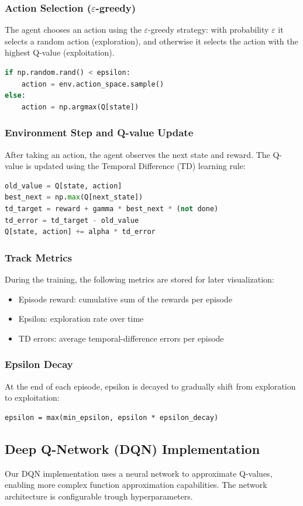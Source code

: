 \documentclass[a4paper,12pt]{article}
\begin{document}
\subsubsection{Action Selection ($\varepsilon$-greedy)}
The agent chooses an action using the $\varepsilon$-greedy strategy: with probability $\varepsilon$ it selects a random action (exploration), and otherwise it selects the action with the highest Q-value (exploitation).
\begin{lstlisting}[language=Python]
if np.random.rand() < epsilon:
    action = env.action_space.sample()
else:
    action = np.argmax(Q[state])
\end{lstlisting}
\subsubsection{Environment Step and Q-value Update}
After taking an action, the agent observes the next state and reward. The Q-value is updated using the Temporal Difference (TD) learning rule:
\begin{lstlisting}[language=Python]
old_value = Q[state, action]
best_next = np.max(Q[next_state])
td_target = reward + gamma * best_next * (not done)
td_error = td_target - old_value
Q[state, action] += alpha * td_error
\end{lstlisting}
\subsubsection{Track Metrics}
During the training, the following metrics are stored for later visualization:
\begin{itemize}
    \item Episode reward: cumulative sum of the rewards per episode
    \item Epsilon: exploration rate over time
    \item TD errors: average temporal-difference errors per episode
\end{itemize}
\subsubsection{Epsilon Decay}
At the end of each episode, epsilon is decayed to gradually shift from exploration to exploitation:
\begin{lstlisting}
epsilon = max(min_epsilon, epsilon * epsilon_decay)
\end{lstlisting}
\subsection{Deep Q-Network (DQN) Implementation}
Our DQN implementation uses a neural network to approximate Q-values, enabling more complex function approximation capabilities. The network architecture is configurable trough hyperparameters.
\end{document}
